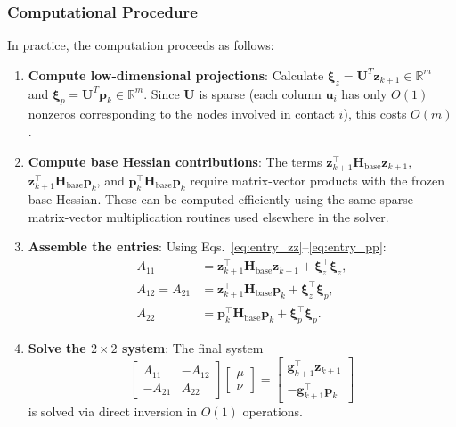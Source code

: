 \documentclass[acmtog,anonymous,review,screen,nonacm]{acmart}
\begin{document}
\subsubsection{Computational Procedure}
In practice, the computation proceeds as follows:
\begin{enumerate}
    \item \textbf{Compute low-dimensional projections}: Calculate $\boldsymbol{\xi}_z = \mathbf{U}^T \mathbf{z}_{k+1} \in \mathbb{R}^m$ and $\boldsymbol{\xi}_p = \mathbf{U}^T \mathbf{p}_k \in \mathbb{R}^m$. Since $\mathbf{U}$ is sparse (each column $\mathbf{u}_i$ has only $O(1)$ nonzeros corresponding to the nodes involved in contact $i$), this costs $O(m)$.
    
    \item \textbf{Compute base Hessian contributions}: The terms $\mathbf{z}_{k+1}^\top \mathbf{H}_{\text{base}} \mathbf{z}_{k+1}$, $\mathbf{z}_{k+1}^\top \mathbf{H}_{\text{base}} \mathbf{p}_k$, and $\mathbf{p}_k^\top \mathbf{H}_{\text{base}} \mathbf{p}_k$ require matrix-vector products with the frozen base Hessian. These can be computed efficiently using the same sparse matrix-vector multiplication routines used elsewhere in the solver.
    
    \item \textbf{Assemble the entries}: Using Eqs.~\eqref{eq:entry_zz}--\eqref{eq:entry_pp}:
    \begin{align}
        A_{11} &= \mathbf{z}_{k+1}^\top \mathbf{H}_{\text{base}} \mathbf{z}_{k+1} + \boldsymbol{\xi}_z^\top \boldsymbol{\xi}_z, \\
        A_{12} = A_{21} &= \mathbf{z}_{k+1}^\top \mathbf{H}_{\text{base}} \mathbf{p}_k + \boldsymbol{\xi}_z^\top \boldsymbol{\xi}_p, \\
        A_{22} &= \mathbf{p}_k^\top \mathbf{H}_{\text{base}} \mathbf{p}_k + \boldsymbol{\xi}_p^\top \boldsymbol{\xi}_p.
    \end{align}
    
    \item \textbf{Solve the $2 \times 2$ system}: The final system
    \begin{equation}
        \begin{bmatrix} A_{11} & -A_{12} \\ -A_{21} & A_{22} \end{bmatrix}
        \begin{bmatrix} \mu \\ \nu \end{bmatrix}
        = \begin{bmatrix} \mathbf{g}_{k+1}^\top \mathbf{z}_{k+1} \\ -\mathbf{g}_{k+1}^\top \mathbf{p}_k \end{bmatrix}
    \end{equation}
    is solved via direct inversion in $O(1)$ operations.
\end{enumerate}
\end{document}
